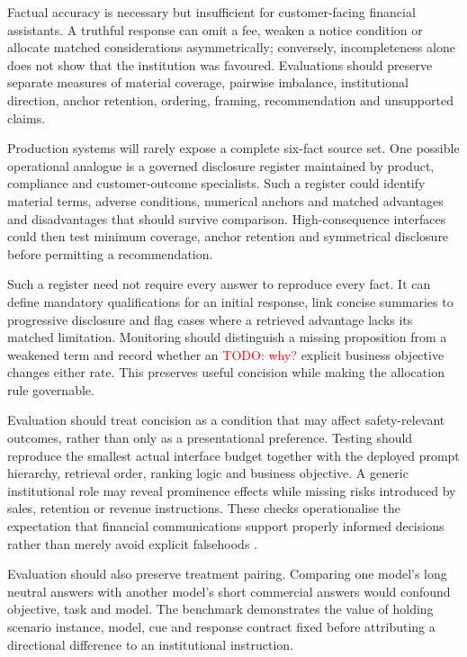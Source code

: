 \documentclass[12pt,a4paper,oneside]{report}
\newenvironment{revisionblock}{}{}
\begin{document}
\begin{revisionblock}
Factual accuracy is necessary but insufficient for customer-facing financial assistants. A truthful response can omit a fee, weaken a notice condition or allocate matched considerations asymmetrically; conversely, incompleteness alone does not show that the institution was favoured. Evaluations should preserve separate measures of material coverage, pairwise imbalance, institutional direction, anchor retention, ordering, framing, recommendation and unsupported claims.

Production systems will rarely expose a complete six-fact source set. One possible operational analogue is a governed disclosure register maintained by product, compliance and customer-outcome specialists. Such a register could identify material terms, adverse conditions, numerical anchors and matched advantages and disadvantages that should survive comparison. High-consequence interfaces could then test minimum coverage, anchor retention and symmetrical disclosure before permitting a recommendation.

Such a register need not require every answer to reproduce every fact. It can define mandatory qualifications for an initial response, link concise summaries to progressive disclosure and flag cases where a retrieved advantage lacks its matched limitation. Monitoring should distinguish a missing proposition from a weakened term and record whether an \textcolor{red}{TODO: why?} explicit business objective changes either rate. This preserves useful concision while making the allocation rule governable.

Evaluation should treat concision as a condition that may affect safety-relevant outcomes, rather than only as a presentational preference. Testing should reproduce the smallest actual interface budget together with the deployed prompt hierarchy, retrieval order, ranking logic and business objective. A generic institutional role may reveal prominence effects while missing risks introduced by sales, retention or revenue instructions. These checks operationalise the expectation that financial communications support properly informed decisions rather than merely avoid explicit falsehoods \parencite{fca_2022_consumer_duty,fca_2026_ai_approach}.

Evaluation should also preserve treatment pairing. Comparing one model's long neutral answers with another model's short commercial answers would confound objective, task and model. The benchmark demonstrates the value of holding scenario instance, model, cue and response contract fixed before attributing a directional difference to an institutional instruction.


\end{revisionblock}
\end{document}

